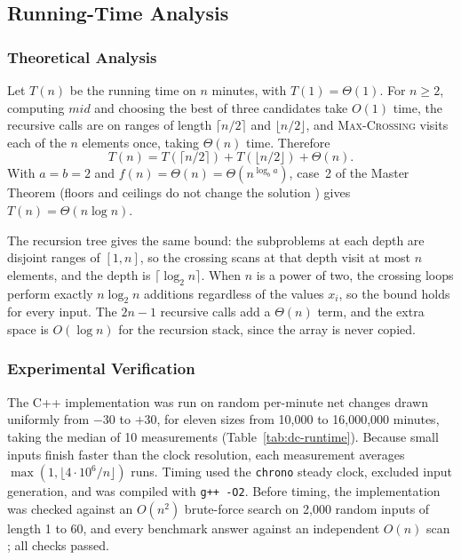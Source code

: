 \subsection{Running-Time Analysis}

\subsubsection{Theoretical Analysis}

Let $T(n)$ be the running time on $n$ minutes, with
$T(1) = \Theta(1)$. For $n \ge 2$, computing
$\mathit{mid}$ and choosing the best of three candidates
take $O(1)$ time, the recursive calls are on ranges of
length $\lceil n/2 \rceil$ and $\lfloor n/2 \rfloor$, and
\textsc{Max-Crossing} visits each of the $n$ elements
once, taking $\Theta(n)$ time. Therefore
\[
T(n) = T(\lceil n/2 \rceil) + T(\lfloor n/2 \rfloor) + \Theta(n).
\]
With $a = b = 2$ and $f(n) = \Theta(n) = \Theta(n^{\log_b a})$,
case~2 of the Master Theorem \cite[Sec.~4.5]{clrs2009}
(floors and ceilings do not change the solution
\cite[Sec.~4.6]{clrs2009}) gives
$\boxed{T(n) = \Theta(n \log n)}$.

The recursion tree gives the same bound: the
subproblems at each depth are disjoint ranges of
$[1, n]$, so the crossing scans at that depth visit at
most $n$ elements, and the depth is
$\lceil \log_2 n \rceil$. When $n$ is a power of two,
the crossing loops perform exactly $n \log_2 n$
additions regardless of the values $x_i$, so the bound
holds for every input. The $2n - 1$ recursive calls add
a $\Theta(n)$ term, and the extra space is $O(\log n)$
for the recursion stack, since the array is never
copied.

\subsubsection{Experimental Verification}

The C++ implementation was run on random per-minute net
changes drawn uniformly from $-30$ to $+30$, for eleven
sizes from 10,000 to 16,000,000 minutes, taking the
median of 10 measurements (Table~\ref{tab:dc-runtime}).
Because small inputs finish faster than the clock
resolution, each measurement averages
$\max(1, \lfloor 4\cdot 10^6 / n \rfloor)$ runs. Timing
used the \texttt{chrono} steady clock, excluded input
generation, and was compiled with \texttt{g++ -O2}.
Before timing, the implementation was checked against an
$O(n^2)$ brute-force search on 2,000 random inputs of
length 1 to 60, and every benchmark answer against an
independent $O(n)$ scan \cite{bentley1984}; all checks
passed.

